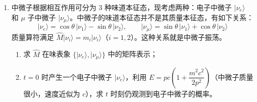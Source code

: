 \begin{enumerate}
{\begin{enumerate}
		对态 $|k_x,\lambda\rangle=e^{i\lambda\hat{\pi}_y}|k_x\rangle$：由于 $[\hat{\pi}_y,\hat{H}]=0$，$\hat{H}$ 的本征值不变，仍为
		\begin{align*}
			E=\frac{eB}{2mc}
		\end{align*}
		对 $\hat{p}_x$：利用 $[\hat{\pi}_y,\hat{p}_x]=ieB/c$，由算符恒等式 $e^{-X}Ye^{X}=Y+[-X,Y]+\cdots$（此处对易子为常数，级数截断）：
		\begin{align*}
			e^{-i\lambda\hat{\pi}_y}\hat{p}_x\,e^{i\lambda\hat{\pi}_y}
			&=\hat{p}_x+[-i\lambda\hat{\pi}_y,\hat{p}_x]\\
			&=\hat{p}_x-i\lambda[\hat{\pi}_y,\hat{p}_x]\\
			&=\hat{p}_x-i\lambda\cdot\frac{ieB}{c}=\hat{p}_x+\frac{\lambda eB}{c}
		\end{align*}
		因此
		\begin{align*}
			\hat{p}_x\,e^{i\lambda\hat{\pi}_y}|k_x\rangle
			&=e^{i\lambda\hat{\pi}_y}\left(e^{-i\lambda\hat{\pi}_y}\hat{p}_x\,e^{i\lambda\hat{\pi}_y}\right)|k_x\rangle\\
			&=e^{i\lambda\hat{\pi}_y}\left(\hat{p}_x+\frac{\lambda eB}{c}\right)|k_x\rangle
			=\left(k_x+\frac{\lambda eB}{c}\right)|k_x,\lambda\rangle
		\end{align*}
		即 $\hat{p}_x$ 的本征值为
		\begin{align*}
			p_x=k_x+\frac{\lambda eB}{c}
		\end{align*}
	\end{enumerate}
	}

	\item
	中微子根据相互作用可分为 3 种味道本征态，现考虑两种：电子中微子 $|\nu_e\rangle$ 和 $\mu$ 子中微子 $|\nu_\mu\rangle$。中微子的味道本征态并不是其质量本征态，有如下关系：
	\[
	|\nu_e\rangle=\cos\theta\,|\nu_1\rangle-\sin\theta\,|\nu_2\rangle,\qquad
	|\nu_\mu\rangle=\sin\theta\,|\nu_1\rangle+\cos\theta\,|\nu_2\rangle
	\]
	质量算符满足 $\hat{M}|\nu_i\rangle=m_i|\nu_i\rangle$（$i=1,2$）。这种关系就是中微子振荡。
	\begin{enumerate}
		\item 求 $\hat{M}$ 在味表象 $\{|\nu_e\rangle,|\nu_\mu\rangle\}$ 中的矩阵表示；
		\item $t=0$ 时产生一个电子中微子 $|\nu_e\rangle$，利用 $E=pc\left(1+\dfrac{m^2 c^2}{2p^2}\right)$（中微子质量很小，速度近似为 $c$），求 $t$ 时刻仍观测到电子中微子的概率。
	\end{enumerate}


\end{enumerate}

